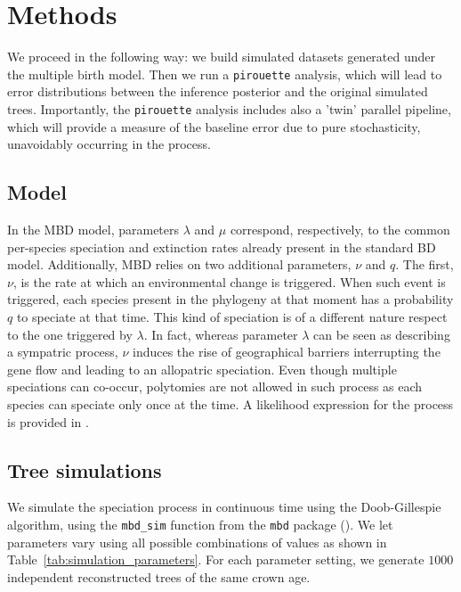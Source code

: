\section{Methods}

We proceed in the following way: we build simulated datasets generated under the multiple birth model. Then we run a \verb;pirouette; analysis, which will lead to error distributions between the inference posterior and the original simulated trees. Importantly, the \verb;pirouette; analysis includes also a 'twin' parallel pipeline, which will provide a measure of the baseline error due to pure stochasticity, unavoidably occurring in the process.

\subsection{Model}

In the MBD model, parameters $\lambda$ and $\mu$ correspond, respectively, to the common per-species speciation and extinction rates already present in the standard BD model. 
Additionally, MBD relies on two additional parameters, $\nu$ and $q$. 
The first, $\nu$, is the rate at which an environmental change is triggered.
When such event is triggered, each species present in the phylogeny at that moment has a probability $q$ to speciate at that time.
This kind of speciation is of a different nature respect to the one triggered by $\lambda$. In fact, whereas parameter $\lambda$ can be seen as describing a sympatric process, $\nu$ induces the rise of geographical barriers interrupting the gene flow  and leading to an allopatric speciation.
Even though multiple speciations can co-occur, polytomies are not allowed in such process as each species can speciate only once at the time.
A likelihood expression for the process is provided in \cite{mbd}.

\subsection{Tree simulations}

We simulate the speciation process in continuous time using the Doob-Gillespie algorithm, using the \verb;mbd_sim; function from the \verb;mbd; package (\citep{mbd}).
We let parameters vary using all possible combinations of values as shown in Table~\ref{tab:simulation_parameters}.
For each parameter setting, we generate $1000$ independent reconstructed trees of the same crown age.


